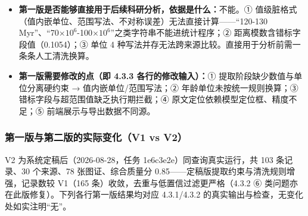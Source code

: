 \begin{itemize}[leftmargin=1.2em,itemsep=2pt]
\item \textbf{第一版是否能够直接用于后续科研分析，依据是什么：}不能。① 值级脏格式（值内嵌单位、范围写法、不对称误差）无法直接计算——“120-130 Myr”、“70$\times10^{6}$-100$\times10^{6}$”之类字符串不能进统计程序；② 距离模数含错标字段值（0.1054）；③ 单位 4 种写法并存无法跨来源比较。直接用于分析前需一条条人工清洗换算。
\item \textbf{第一版需要修改的点（即 4.3.3 各行的修改输入）：}① 提取阶段缺少数值与单位分离硬约束 → 值内嵌单位/范围写法；② 年龄单位未按统一规则换算；③ 错标字段与超范围值缺乏执行期拦截；④ 原文定位依赖模型定位框、精度不足；⑤ 前端展示与导出数据不同源。
\end{itemize}

\subsubsection{第一版与第二版的实际变化（V1 vs V2）}

V2 为系统定稿后（2026-08-28，任务 1e6c3e2e）同查询真实运行，共 103 条记录、30 个来源、78 张图证、综合质量分 0.85——定稿版提取约束与清洗规则增强，记录数较 V1（165 条）收敛，去重与低置信过滤更严格（4.3.2 ⑥ 类问题亦在此版修复）。下列各行第一版结果均对应 4.3.1/4.3.2 的真实输出与检查，无变化处如实注明“无”。

